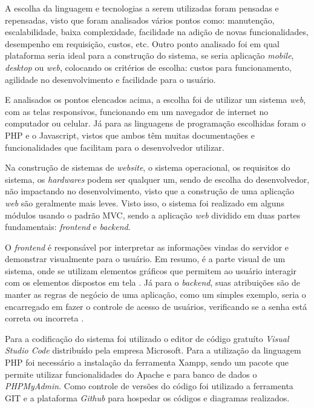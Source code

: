 \documentclass[
	12pt,				%
	openright,			%
	oneside,			%
	a4paper,			%
	english,			%
	french,				%
	spanish,			%
	brazil,				%
	]{abntex2}
\begin{document}
A escolha da linguagem e tecnologias a serem utilizadas foram pensadas e repensadas, visto que foram analisados vários pontos como: manutenção, escalabilidade, baixa complexidade, facilidade na adição de novas funcionalidades, desempenho em requisição, custos, etc.
Outro ponto analisado foi em qual plataforma seria ideal para a construção do sistema, se seria aplicação \textit{mobile}, \textit{desktop} ou \textit{web}, colocando os critérios de escolha: custos para funcionamento, agilidade no desenvolvimento e facilidade para o usuário.

E analisados os pontos elencados acima, a escolha foi de utilizar um sistema \textit{web}, com as telas responsivos, funcionando em um navegador de internet no computador ou celular. Já para as linguagens de programação escolhidas foram o PHP e o Javascript, vistos que ambos têm muitas documentações e funcionalidades que facilitam para o desenvolvedor utilizar.

Na construção de sistemas de \textit{website}, o sistema operacional, os requisitos do sistema, os \textit{hardwares} podem ser qualquer um, sendo de escolha do desenvolvedor, não impactando no desenvolvimento, visto que a construção de uma aplicação \textit{web} são geralmente mais leves. Visto isso, o sistema foi realizado em alguns módulos usando o padrão MVC, sendo a aplicação \textit{web} dividido em duas partes fundamentais: \textit{frontend} e \textit{backend}.  
 
O \textit{frontend} é responsável por interpretar as informações vindas do servidor e demonstrar visualmente para o usuário. Em resumo, é a parte visual de um sistema, onde se utilizam elementos gráficos que permitem ao usuário interagir com os elementos dispostos em tela \cite{Alura}. Já para o \textit{backend}, suas atribuições são de manter as regras de negócio de uma aplicação, como um simples exemplo, seria o encarregado em fazer o controle de acesso de usuários, verificando se a senha está correta ou incorreta \cite{Rocketseat}.

Para a codificação do sistema foi utilizado o editor de código gratuíto \textit{Visual Studio Code} distribuído pela empresa Microsoft. Para a utilização da linguagem PHP foi necessário a instalação da ferramenta Xampp, sendo um pacote que permite utilizar funcionalidades do Apache e para banco de dados o \textit{PHPMyAdmin}. Como controle de versões do código foi utilizado a ferramenta GIT e a plataforma \textit{Github} para hospedar os códigos e diagramas realizados. 
\end{document}
